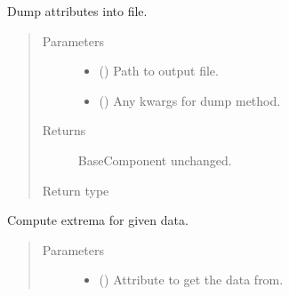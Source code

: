 \documentclass[letterpaper,10pt,english]{sphinxmanual}
\begin{document}
\begin{fulllineitems}
\begin{fulllineitems}
\end{fulllineitems}


\begin{fulllineitems}
\label{\detokenize{api/rock:geology.src.Rock.dump}}
Dump attributes into file.
\begin{quote}\begin{description}
\item[{Parameters}] \leavevmode\begin{itemize}
\item {} 
 () \textendash{} Path to output file.

\item {} 
 (\sphinxstyleliteralemphasis{\sphinxupquote{, }}) \textendash{} Any kwargs for dump method.

\end{itemize}

\item[{Returns}] \leavevmode
{} \textendash{} BaseComponent unchanged.

\item[{Return type}] \leavevmode
{\hyperref[\detokenize{api/base_classes:geology.src.base_component.BaseComponent}]{}}

\end{description}\end{quote}

\end{fulllineitems}


\begin{fulllineitems}
\label{\detokenize{api/rock:geology.src.Rock.extrema}}
Compute extrema for given data.
\begin{quote}\begin{description}
\item[{Parameters}] \leavevmode\begin{itemize}
\item {} 
 (\sphinxstyleliteralemphasis{\sphinxupquote{, }}) \textendash{} Attribute to get the data from.


\end{itemize}
\end{description}
\end{quote}
\end{fulllineitems}
\end{fulllineitems}
\end{document}
